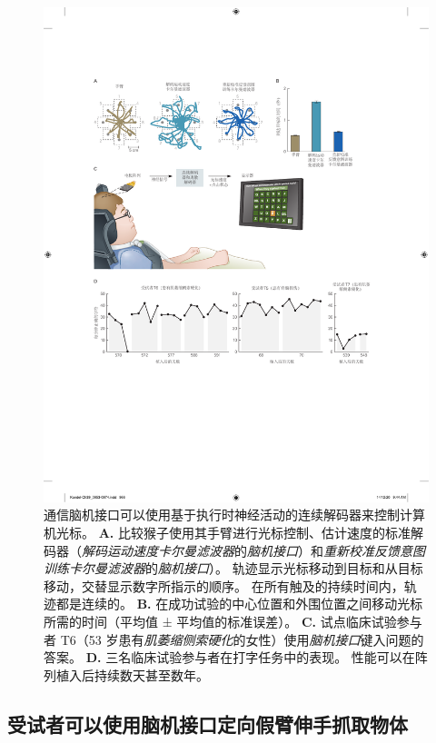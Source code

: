 \begin{figure}[htbp]
	\centering
	\includegraphics[width=0.9\linewidth]{chap39/fig_39_8}
	\caption{通信脑机接口可以使用基于执行时神经活动的连续解码器来控制计算机光标。
		\textbf{A.} 比较猴子使用其手臂进行光标控制、估计速度的标准解码器（\textit{解码运动速度卡尔曼滤波器}的\textit{脑机接口}）和\textit{重新校准反馈意图训练卡尔曼滤波器}的\textit{脑机接口}）。
		轨迹显示光标移动到目标和从目标移动，交替显示数字所指示的顺序。
		在所有触及的持续时间内，轨迹都是连续的\cite{gilja2012high}。
		\textbf{B.} 在成功试验的中心位置和外围位置之间移动光标所需的时间（平均值 ± 平均值的标准误差）\cite{gilja2012high}。 
		\textbf{C.} 试点临床试验参与者 T6（53 岁患有\textit{肌萎缩侧索硬化}的女性）使用\textit{脑机接口}键入问题的答案\cite{pandarinath2017high}。
		\textbf{D.} 三名临床试验参与者在打字任务中的表现。
		性能可以在阵列植入后持续数天甚至数年\cite{pandarinath2017high}。}
	\label{fig:39_8}
\end{figure}



\subsection{受试者可以使用脑机接口定向假臂伸手抓取物体}


